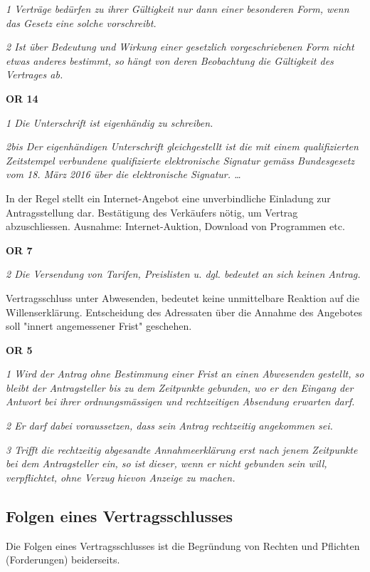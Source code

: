   \textit{
  1 Verträge bedürfen zu ihrer Gültigkeit nur dann einer besonderen Form, wenn das Gesetz eine solche vorschreibt.}

  \textit{2 Ist über Bedeutung und Wirkung einer gesetzlich vorgeschriebenen Form nicht etwas anderes bestimmt, so hängt von deren Beobachtung die Gültigkeit des Vertrages ab.}

  \noindent
  \textbf{OR 14} 

  \textit{1 Die Unterschrift ist eigenhändig zu schreiben.}

  \textit{2bis Der eigenhändigen Unterschrift gleichgestellt ist die mit einem qualifizierten Zeitstempel verbundene qualifizierte elektronische Signatur gemäss Bundesgesetz vom 18. März 2016 über die elektronische Signatur. \ldots}
  \vspace{3mm}

In der Regel stellt ein Internet-Angebot eine unverbindliche Einladung zur Antragsstellung dar. Bestätigung des Verkäufers nötig, um Vertrag abzuschliessen. Ausnahme: Internet-Auktion, Download von Programmen etc.

\noindent
\textbf{OR 7}

\textit{2 Die Versendung von Tarifen, Preislisten u. dgl. bedeutet an sich keinen Antrag.}
\vspace{3mm}

Vertragsschluss unter Abwesenden, bedeutet keine unmittelbare Reaktion auf die Willenserklärung. Entscheidung des Adressaten über die Annahme des Angebotes soll "innert angemessener Frist" geschehen.

\noindent
\textbf{OR 5}

\textit{1 Wird der Antrag ohne Bestimmung einer Frist an einen Abwesenden gestellt, so bleibt der Antragsteller bis zu dem Zeitpunkte gebunden, wo er den Eingang der Antwort bei ihrer ordnungsmässigen und rechtzeitigen Absendung erwarten darf.}

\textit{2 Er darf dabei voraussetzen, dass sein Antrag rechtzeitig angekommen sei.}

\textit{3 Trifft die rechtzeitig abgesandte Annahmeerklärung erst nach jenem Zeitpunkte bei dem Antragsteller ein, so ist dieser, wenn er nicht gebunden sein will, verpflichtet, ohne Verzug hievon Anzeige zu machen.}

\subsection{Folgen eines Vertragsschlusses}
Die Folgen eines Vertragsschlusses ist die Begründung von Rechten und Pflichten (Forderungen) beiderseits. 

